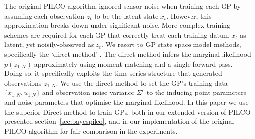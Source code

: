 \documentclass{article}
\newcommand{\new}[1]{#1_{t+1}}
\begin{document}
The original PILCO algorithm ignored sensor noise when training each GP
by assuming each observation $z_t$ to be the latent state $x_t$.
However, this approximation breaks down under significant noise.
More complex training schemes are required for each GP
that correctly treat each training datum $x_t$ as latent,
yet noisily-observed as $z_t$.
We resort to GP state space model methods, %
specifically the `direct method' \cite[section 3.5]{mchutchon2014}.
The direct method infers the marginal likelihood $p(z_{1:N})$ approximately
using moment-matching and a single forward-pass.
Doing so, it specifically exploits the time series structure that generated observations $z_{1:N}$.
We use the direct method to set the GP's training data $\{x_{1:N},u_{1:N}\}$ and
observation noise variance $\Sigma^\epsilon$
to the inducing point parameters and noise parameters that optimise the marginal likelihood.
In this paper we use the superior Direct method to train GPs,
both in our extended version of PILCO presented section~\ref{sec:bayespilco},
and in our implementation of the original PILCO algorithm for fair comparison in the experiments.
\end{document}
